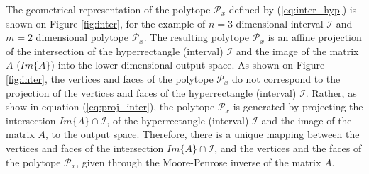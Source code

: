 The geometrical representation of the polytope $\mathcal{P}_x$ defined by (\ref{eq:inter_hyp}) is shown on Figure \ref{fig:inter}, for the example of $n=3$ dimensional interval $\mathcal{I}$ and $m=2$ dimensional polytope $\mathcal{P}_x$. 
The resulting polytope $\mathcal{P}_x$ is an affine projection of the intersection of the hyperrectangle (interval) $\mathcal{I}$ and the image of the matrix $A$ ($Im\{A\}$) into the lower dimensional output space. As shown on Figure \ref{fig:inter}, the vertices and faces of the polytope $\mathcal{P}_x$ do not correspond to the projection of the vertices and faces of the hyperrectangle (interval) $\mathcal{I}$. 
Rather, as show in equation (\ref{eq:proj_inter}), the polytope $\mathcal{P}_x$ is generated by projecting the intersection $Im\{A\}\cap\mathcal{I}$, of the hyperrectangle (interval) $\mathcal{I}$ and the image of the matrix $A$, to the output space. 
Therefore, there is a unique mapping between the vertices and faces of the intersection $Im\{A\}\cap\mathcal{I}$, and the vertices and the faces of the polytope $\mathcal{P}_x$, given through the Moore-Penrose inverse\cite{wang2018generalized} of the matrix $A$. 

